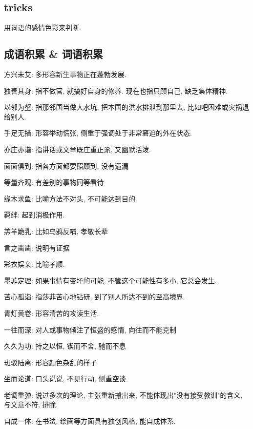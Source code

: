 \subsection{tricks}

用词语的感情色彩来判断.

\subsection{成语积累 \& 词语积累}
方兴未艾: 多形容新生事物正在蓬勃发展.

独善其身: 指不做官, 就搞好自身的修养. 现在也指只顾自己, 缺乏集体精神.

以邻为壑: 指那邻国当做大水坑, 把本国的洪水排泄到那里去, 比如吧困难或灾祸退给别人.

手足无措: 形容举动慌张, 侧重于强调处于非常窘迫的外在状态.

亦庄亦谐: 指讲话或文章既庄重正派, 又幽默活泼.

面面俱到: 指各方面都要照顾到, 没有遗漏

等量齐观: 有差别的事物同等看待

缘木求鱼: 比喻方法不对头, 不可能达到目的.

羁绊: 起到消极作用.

羔羊跪乳: 比如乌鸦反哺, 孝敬长辈

言之凿凿: 说明有证据

彩衣娱亲: 比喻孝顺.

墨菲定理: 如果事情有变坏的可能, 不管这个可能性有多小, 它总会发生.

苦心孤诣: 指莎菲苦心地钻研, 到了别人所达不到的至高境界.

青灯黄卷: 形容清苦的攻读生活.

一往而深: 对人或事物倾注了恒盛的感情, 向往而不能克制

久久为功: 持之以恒, 锲而不舍, 驰而不息

斑驳陆离: 形容颜色杂乱的样子

坐而论道: 口头说说, 不见行动, 侧重空谈

老调重弹: 说过多次的理论, 主张重新搬出来, 不能体现出"没有接受教训"的含义, 与文意不符, 排除.

自成一体: 在书法, 绘画等方面具有独创风格, 能自成体系.